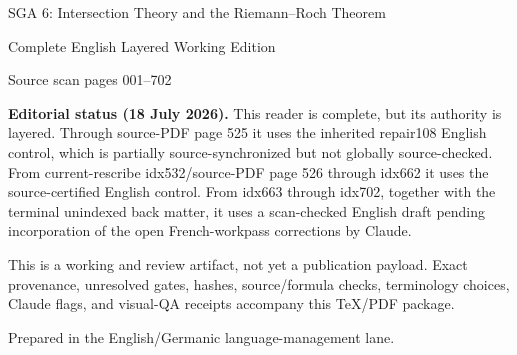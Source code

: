 \documentclass[11pt]{article}
\begin{document}
\begin{titlepage}
\thispagestyle{empty}
\begin{center}
\vspace*{0.12\textheight}
{\LARGE SGA 6: Intersection Theory and the Riemann--Roch Theorem\par}
\vspace{1.2em}
{\Large Complete English Layered Working Edition\par}
\vspace{2.5em}
{\large Source scan pages 001--702\par}
\vfill
\end{center}

\textbf{Editorial status (18 July 2026).}
This reader is complete, but its authority is layered.  Through source-PDF
page 525 it uses the inherited repair108 English control, which is partially
source-synchronized but not globally source-checked.  From current-rescribe
idx532/source-PDF page 526 through idx662 it uses the source-certified English
control.  From idx663 through idx702, together with the terminal unindexed
back matter, it uses a scan-checked English draft pending incorporation of the
open French-workpass corrections by Claude.

This is a working and review artifact, not yet a publication payload.  Exact
provenance, unresolved gates, hashes, source/formula checks, terminology
choices, Claude flags, and visual-QA receipts accompany this TeX/PDF package.
\vfill
\begin{center}
Prepared in the English/Germanic language-management lane.
\end{center}
\end{titlepage}



\clearpage


\end{document}
